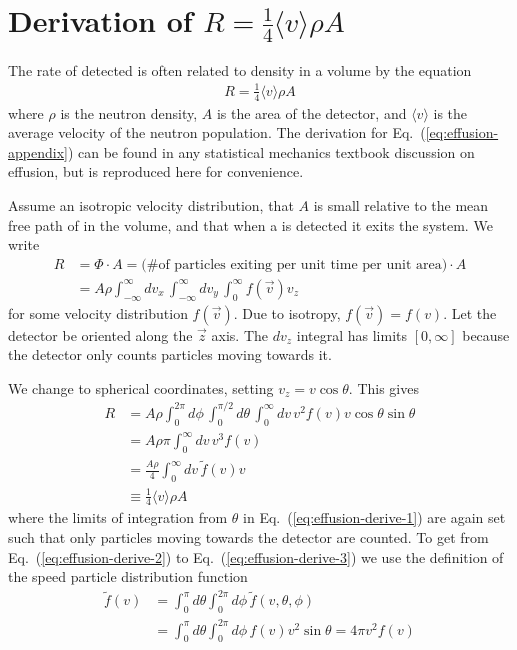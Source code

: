 
\chapter{
    \texorpdfstring{Derivation of $R=\frac{1}{4}\langle v \rangle \rho A$}
    {R=1/4 v rho A}\label{appx:ucn_effusion}
}

The rate of detected \ucn is often related to density in a volume by the equation
%
\begin{gather}
    R=\frac{1}{4}\langle v \rangle \rho A\label{eq:effusion-appendix}
\end{gather}
%
where $\rho$ is the neutron density, $A$ is the area of the detector, and  $\langle v \rangle$ is the average velocity of the neutron population. The derivation for Eq.~(\ref{eq:effusion-appendix}) can be found in any statistical mechanics textbook discussion on effusion, but is reproduced here for convenience.

Assume an isotropic velocity distribution, that $A$ is small relative to the mean free path of \ucn in the volume, and that when a \ucn is detected it exits the system.  We write
%
\begin{align}
    R &=\Phi \cdot A = \text{(\# of particles exiting per unit time per unit area)} \cdot A \nonumber \\
    &= A \rho \int^\infty_{-\infty}dv_x \, \int^\infty_{-\infty}dv_y \, \int^\infty_{0} f(\vec{v})v_z
\end{align}
%
for some velocity distribution $f(\vec{v})$. Due to isotropy, $f(\vec{v})=f(v)$. Let the detector be oriented along the $\vec{z}$ axis. The $dv_z$ integral has limits $[0,\infty]$ because the detector only counts particles moving towards it.

We change to spherical coordinates, setting $v_z = v\cos \theta$. This gives
%
\begin{align}
    R &= A \rho \int^{2\pi}_0 d\phi \, \int^{\pi/2}_0 d\theta \, \int^\infty_0 dv \, v^2 f(v) v \cos \theta \sin \theta \label{eq:effusion-derive-1} \\
    &= A \rho \pi \int^\infty_0 dv \, v^3 f(v) \label{eq:effusion-derive-2} \\
    &= \frac{A\rho}{4} \int^\infty_0 dv \, \tilde{f}(v)v \label{eq:effusion-derive-3} \\
    &\equiv \frac{1}{4}\langle v \rangle \rho A
\end{align}
%
where the limits of integration from $\theta$ in Eq.~(\ref{eq:effusion-derive-1}) are again set such that only particles moving towards the detector are counted. To get from Eq.~(\ref{eq:effusion-derive-2}) to Eq.~(\ref{eq:effusion-derive-3}) we use the definition of the speed particle distribution function
%
\begin{align}
    \tilde{f}(v) &= \int^\pi_0 d\theta \int^{2\pi}_0 d\phi \, \tilde{f}(v,\theta,\phi) \\
    &= \int^\pi_0 d\theta \int^{2\pi}_0 d\phi \, f(v)v^2\sin \theta = 4\pi v^2 f(v)
\end{align}
